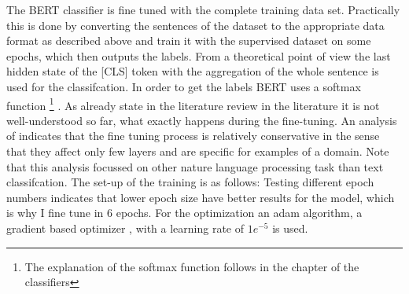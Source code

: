 \documentclass[12pt, a4paper, titlepage]{article}
\begin{document}
The \ac{BERT} classifier is fine tuned with the complete training data set. Practically this is done by converting the sentences of the dataset to the appropriate data format as described above and train it with the supervised dataset on some epochs, which then outputs  the labels. From a theoretical point of view the last hidden state of the [CLS] token with the aggregation of the whole sentence is used for the classifcation. In order to get the labels \ac{BERT} uses a softmax function \footnote{The explanation of the softmax function follows in the chapter of the classifiers} \citep{sun2019}. As already state in the literature review in the literature it is not well-understood so far, what exactly happens during the fine-tuning. An analysis of \citet{merchant2020} indicates that the fine tuning process is relatively conservative in the sense that they affect only few layers and are specific for examples of a domain. Note that this analysis focussed on other nature language processing task than text classifcation. The set-up of the training is as follows: Testing different epoch numbers indicates that lower epoch size have better results for the model, which is why I fine tune in 6 epochs. For the optimization an adam algorithm, a gradient based optimizer \citep{kingma2014}, with a learning rate of $1e^{-5}$ is used. 
\end{document}
